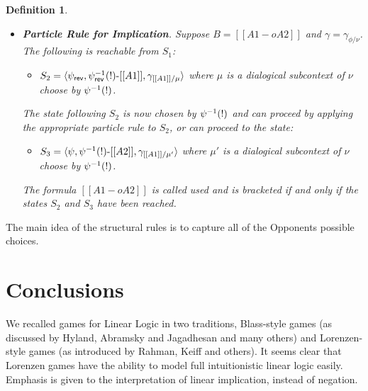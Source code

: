 \documentclass{article}
\newtheorem{definition}[theorem]{Definition}
\begin{document}
\begin{definition}
\begin{center}
\begin{itemize}
    \item[] \textbf{Particle Rule for Implication}. Suppose
      $B = [[A1 -o A2]]$ and $\gamma = \gamma_{\phi/\nu}$. The
      following is reachable from $S_1$:
      \begin{center}
        \begin{itemize}
        \item $S_2 = \langle \psi_{\mathsf{rev}}, 
                              \psi^{-1}_{\mathsf{rev}}(!)\text{-}[[A1]],
                              \gamma_{[[A1]]/\mu}
                     \rangle$ 
          where $\mu$ is a dialogical subcontext of $\nu$ choose by
          $\psi^{-1}(!)$.\\        
        \end{itemize}                
      \end{center}
      The state following $S_2$ is now chosen by $\psi^{-1}(!)$ and can
      proceed by applying the appropriate particle rule to $S_2$, or
      can proceed to the state:
      \begin{center}
        \begin{itemize}
        \item $S_3 = \langle \psi, 
                              \psi^{-1}(!)\text{-}[[A2]],
                              \gamma_{[[A1]]/\mu'}
                     \rangle$ 
              where $\mu'$ is a dialogical subcontext of $\nu$ choose by
              $\psi^{-1}(!)$.\\        
        \end{itemize}                
      \end{center}
      The formula $[[A1 -o A2]]$ is called used and is bracketed if
      and only if the states $S_2$ and $S_3$ have been reached.
    \end{itemize}
  \end{center}
\end{definition}

The main idea of the structural rules is to capture all of the
Opponents possible choices.

 \section{Conclusions}
 We recalled games for Linear Logic in two traditions, Blass-style
 games (as discussed by Hyland, Abramsky and Jagadhesan and many
 others) and Lorenzen-style games (as introduced by Rahman, Keiff and
 others). It seems clear that Lorenzen games have the ability to model
 full intuitionistic linear logic easily. Emphasis is given to the
 interpretation of linear implication, instead of negation.
 
\end{document}
